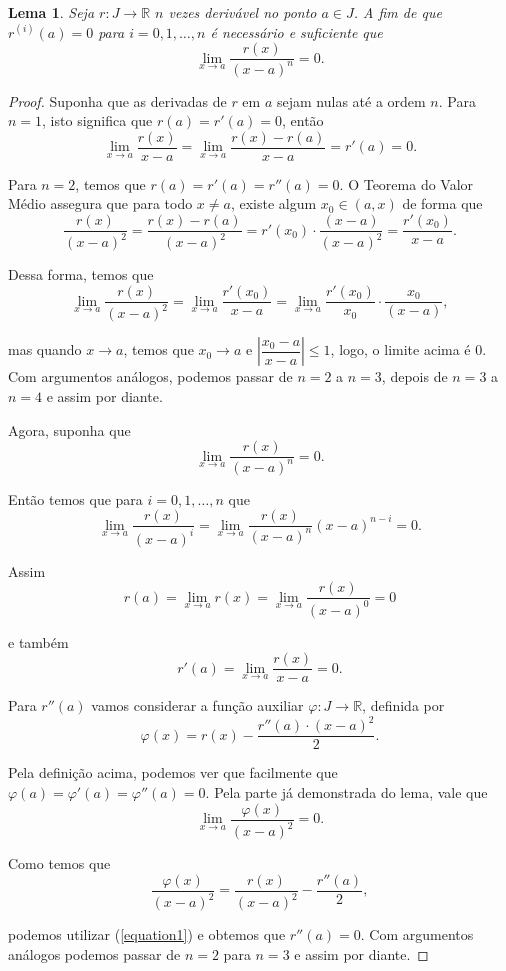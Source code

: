 \documentclass{article}
\newtheorem{lemma}[theorem]{Lema}
\begin{document}
\begin{lemma}
    Seja $r : J \to \mathbb{R}$ $n$ vezes derivável no ponto $a \in J$. A fim de que $r^{(i)}(a) = 0$ para $i = 0, 1, \dots, n$ é necessário e suficiente que
    \[\lim_{x \to a} \dfrac{r(x)}{(x - a)^n} = 0.\]
\end{lemma}

\begin{proof}
    Suponha que as derivadas de $r$ em $a$ sejam nulas até a ordem $n$. Para $n = 1$, isto significa que $r(a) = r'(a) = 0$, então
    \[\lim_{x\to a} \dfrac{r(x)}{x - a} = \lim_{x\to a} \dfrac{r(x) - r(a)}{x - a} = r'(a) = 0.\]
    
    Para $n = 2$, temos que $r(a) = r'(a) = r''(a) = 0$. O Teorema do Valor Médio assegura que para todo $x \neq a$, existe algum $x_0 \in (a, x)$ de forma que
    \[\dfrac{r(x)}{(x - a)^2} = \dfrac{r(x) - r(a)}{(x - a)^2} = r'(x_0)\cdot \dfrac{(x - a)}{(x - a)^2} = \dfrac{r'(x_0)}{x - a}.\]
    
    Dessa forma, temos que
    \[\lim_{x\to a} \dfrac{r(x)}{(x - a)^2} = \lim_{x \to a} \dfrac{r'(x_0)}{x - a} = \lim_{x\to a} \dfrac{r'(x_0)}{x_0}\cdot \dfrac{x_0}{(x - a)},\]
    
    mas quando $x\to a$, temos que $x_0 \to a$ e $\left|\dfrac{x_0 - a}{x - a}\right| \leq 1$, logo, o limite acima é $0$. Com argumentos análogos, podemos passar de $n = 2$ a $n = 3$, depois de $n = 3$ a $n = 4$ e assim por diante.
    
    Agora, suponha que
    \[\lim_{x\to a} \dfrac{r(x)}{(x - a)^n} = 0.\]
    
    Então temos que para $i = 0, 1, \dots, n$ que
    \[\lim_{x\to a} \dfrac{r(x)}{(x - a)^i} = \lim_{x\to a} \dfrac{r(x)}{(x - a)^n}(x - a)^{n - i} = 0.\]
    
    Assim
    \[r(a) = \lim_{x\to a} r(x) = \lim_{x\to a} \dfrac{r(x)}{(x - a)^0} = 0\]
    
    e também
    \[r'(a) = \lim_{x\to a} \dfrac{r(x)}{x - a} = 0.\]
    
    Para $r''(a)$ vamos considerar a função auxiliar $\varphi : J \to \mathbb{R}$, definida por
    \[\varphi(x) = r(x) - \dfrac{r''(a)\cdot (x - a)^2}{2}.\]
    
    Pela definição acima, podemos ver que facilmente que $\varphi(a) = \varphi'(a) = \varphi''(a) = 0$. Pela parte já demonstrada do lema, vale que
    \begin{equation}
        \lim_{x\to a} \dfrac{\varphi(x)}{(x - a)^2} = 0.
        \label{equation1}
    \end{equation}
    
    Como temos que
    \[\dfrac{\varphi(x)}{(x - a)^2} = \dfrac{r(x)}{(x - a)^2} - \dfrac{r''(a)}{2},\]
    
    podemos utilizar (\ref{equation1}) e obtemos que $r''(a) = 0$. Com argumentos análogos podemos passar de $n = 2$ para $n = 3$ e assim por diante.
\end{proof}
\end{document}
